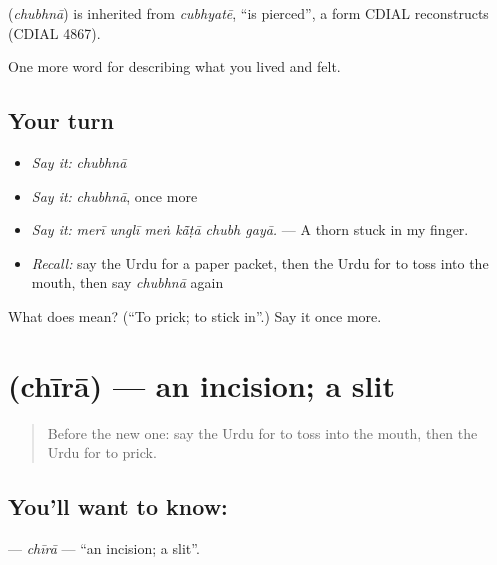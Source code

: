 \begin{cousinweb}
\textbf{} (\emph{chubhnā}) is inherited from \emph{cubhyatē}, \textquotedblleft{}is pierced\textquotedblright{}, a form CDIAL reconstructs (CDIAL 4867).
\end{cousinweb}

\begin{grammarlens}[title={What you've built}]
One more word for describing what you lived and felt.
\end{grammarlens}

\subsection*{Your turn}
\begin{itemize}
\raggedright
  \item \emph{Say it:} \emph{chubhnā}
  \item \emph{Say it:} \emph{chubhnā}, once more
  \item \emph{Say it:} \emph{merī unglī meṅ kā̃ṭā chubh gayā.} — A thorn stuck in my finger.
  \item \emph{Recall:} say the Urdu for a paper packet, then the Urdu for to toss into the mouth, then say \emph{chubhnā} again
\end{itemize}

\begin{tcolorbox}[breakable,colback=teal!4,colframe=teal!35!black,title={Before you move on}]
What does  mean? (\textquotedblleft{}To prick; to stick in\textquotedblright{}.) Say it once more.
\end{tcolorbox}
\section[\texorpdfstring{\ur{چیرا} (chīrā)}{چیرا (chīrā)}]{ (chīrā) — an incision; a slit}

\label{lesson:UR-C478-chira}



\begin{quote}
Before the new one: say the Urdu for to toss into the mouth, then the Urdu for to prick.
\end{quote}

\subsection*{You'll want to know: }
\textbf{} — \emph{chīrā} — \textquotedblleft{}an incision; a slit\textquotedblright{}.

